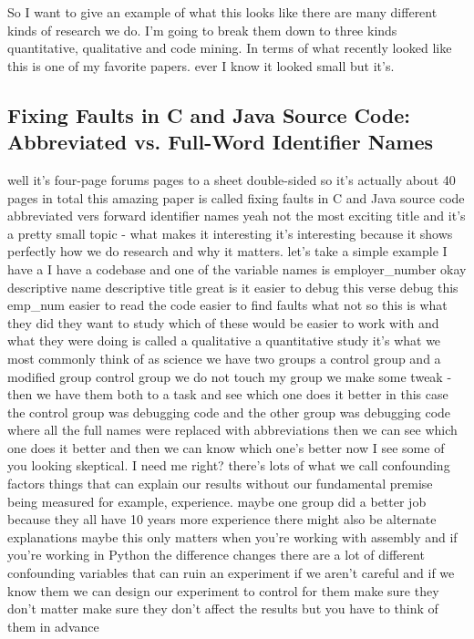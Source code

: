 \documentclass[conference, compsoc, twoside]{IEEEtran}
\begin{document}

So I want to give an example of what this looks like there are many different kinds of research we do.
I'm going to break them down to three kinds quantitative, qualitative and code mining.
In terms of what recently looked like this is one of my favorite papers.
ever I know it looked small but it's.
\subsection{Fixing Faults in C and Java Source Code: Abbreviated vs. Full-Word Identifier Names}
well it's four-page forums pages to a sheet double-sided so it's actually about 40 pages in total this amazing paper is called fixing faults in C and Java source code
abbreviated vers forward identifier
names yeah not the most exciting title
and it's a pretty small topic - what
makes it interesting it's interesting
because it shows perfectly how we do
research and why it matters.
let's take a simple example I have a I
have a codebase and one of the variable
names is employer\_number okay
descriptive name descriptive title great
is it easier to debug this verse debug
this emp\_num easier to read the code
easier to find faults what not so this
is what they did they want to study
which of these would be easier to work
with and what they were doing is called a qualitative a quantitative study it's
what we most commonly think of as science we have two groups a control
group and a modified group control group
we do not touch my group we make some
tweak - then we have them both to a task
and see which one does it better in this
case the control group was debugging
code and the other group was debugging
code where all the full names were
replaced with abbreviations then we can
see which one does it better and then we
can know which one's better now I see
some of you looking skeptical. I need me
right? there's lots of what we call
confounding factors things that can
explain our results without our
fundamental premise being measured for
example, experience.
 maybe one group did a better job because they all have 10
years more experience there might also
be alternate explanations
maybe this only matters when you're
working with assembly and if you're
working in Python the difference changes
there are a lot of different confounding
variables that can ruin an experiment if
we aren't careful and if we know them we
can design our experiment to control for
them make sure they don't matter
make sure they don't affect the results
but you have to think of them in advance
\end{document}
